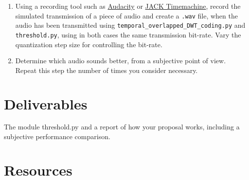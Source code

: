 \begin{enumerate}
\item Using a recording tool such as
  \href{http://audacity.sourceforge.net}{Audacity} or
  \href{http://plugin.org.uk/timemachine/}{JACK Timemachine}, record
  the simulated transmission of a piece of audio and create a
  \texttt{.wav} file, when the audio has been transmitted using
  \texttt{temporal\_overlapped\_DWT\_coding.py} and
  \texttt{threshold.py}, using in both cases the same transmission
  bit-rate. Vary the quantization step size for controlling the
  bit-rate.
\item Determine which audio sounds better, from a subjective point of
  view. Repeat this step the number of times you consider necessary.
\end{enumerate}

\section{Deliverables}

The module threshold.py and a report of how your proposal works,
including a subjective performance comparison.

\section{Resources}



